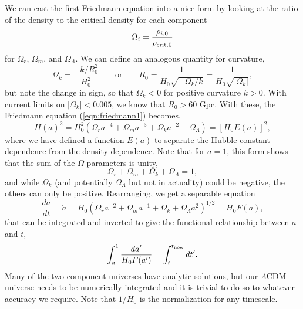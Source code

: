 We can cast the first Friedmann equation into a nice form by looking at the ratio of the density to the critical density for each component
\begin{equation}
  \Omega_i = \frac{\rho_{i,0}}{\rho_{\rm crit,0}}
\end{equation}
for $\Omega_r$, $\Omega_m$, and $\Omega_\Lambda$.
We can define an analogous quantity for curvature, 
\begin{equation}
  \Omega_k = \frac{-k/R_0^2}{H_0^2}   \qquad \mbox{or} \qquad R_0 = \frac{1}{H_0\sqrt{-\Omega_k / k}}  = \frac{1}{H_0\sqrt{|\Omega_k|}},
\end{equation}
but note the change in sign, so that $\Omega_k<0$ for positive curvature $k>0$.  With current limits on $|\Omega_k| < 0.005$, we know that $R_0 > 60$ Gpc.   With these, the Friedmann equation (\ref{eqn:friedmann1}) becomes,
\begin{equation}
  H(a)^2 = H_0^2 ( \Omega_r a^{-4} + \Omega_m a^{-3} + \Omega_k  a^{-2}+  \Omega_\Lambda ) = [ H_0 E(a) ]^2, \label{eqn:H_in_terms_of_Omega}
\end{equation}
where we have defined a function $E(a)$ to separate the Hubble constant dependence from the density dependence. Note that for $a=1$, this form shows that the sum of the $\Omega$ parameters is unity,
\begin{equation}
  \Omega_r + \Omega_m  + \Omega_k  +  \Omega_\Lambda  = 1, 
\end{equation}
and while $\Omega_k$ (and potentially $\Omega_\Lambda$ but not in actuality) could be negative, the others can only be positive.  Rearranging, we get a separable equation
\begin{equation}
\frac{da}{dt} = \dot a = H_0 (\Omega_r a^{-2} + \Omega_m a^{-1} + \Omega_k  +  \Omega_\Lambda a^2)^{1/2} = H_0 F(a), \label{eqn:friedmann_adot}
\end{equation}
that can be integrated and inverted to give the functional relationship between $a$ and $t$,
\begin{equation}
  \int^1_a \frac{da'}{H_0 F(a')} =  \int^{t_{\rm now}}_t dt'.
\end{equation}
Many of the two-component universes have analytic solutions, but our $\Lambda$CDM universe needs to be numerically integrated and it is trivial to do so to whatever accuracy we require.  Note that $1/H_0$ is the normalization for any timescale.


